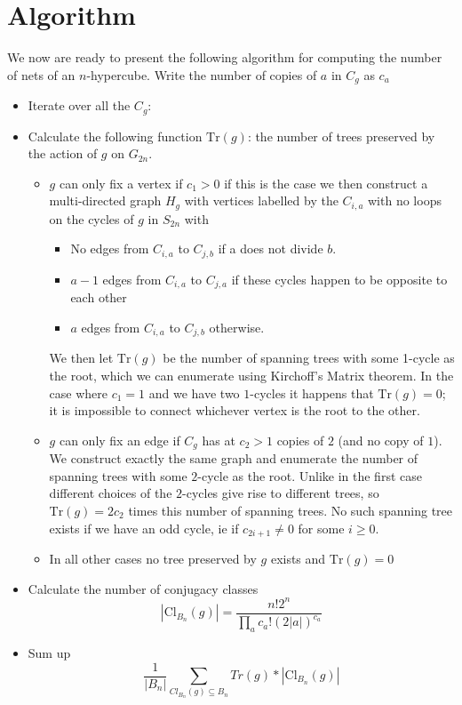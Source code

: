 \documentclass[10pt]{article}
\newcommand{\Tr}{\text{Tr}}
\newcommand{\Cl}{\text{Cl}}
\begin{document}
\section{Algorithm}
 We now are ready to present the following algorithm for computing the number of nets of an $n$-hypercube.
 Write the number of copies of $a$ in $C_g$ as $c_a$
\begin{itemize}
\item Iterate over all the $C_g$:
\item Calculate the following function $\Tr(g)$: the number of trees preserved by the action of $g$ on $G_{2n}$.
  \begin{itemize}
  \item $g$ can only fix a vertex if $c_1>0$ if this is the case we then construct a multi-directed graph $H_g$ with vertices labelled by the $C_{i,a}$ with no loops on the cycles of $g$ in $S_{2n}$ with
    \begin{itemize}
    \item No edges from $C_{i,a}$ to $C_{j,b}$ if a does not divide $b$.
    \item $a-1$ edges from $C_{i,a}$ to $C_{j,a}$ if these cycles happen to be opposite to each other
    \item $a$ edges from $C_{i,a}$ to $C_{j,b}$ otherwise.
    \end{itemize}
    We then let $\Tr(g)$ be the number of spanning trees with some 1-cycle as the root, which we can enumerate using Kirchoff's Matrix theorem. In the case where $c_1=1$ and we have two $1$-cycles it happens that $\Tr(g)=0$; it is impossible to connect whichever vertex is the root to the other.
  \item $g$ can only fix an edge if $C_g$ has at $c_2>1$ copies of $2$ (and no copy of $1$). We construct exactly the same graph and enumerate the number of spanning trees with some $2$-cycle as the root. Unlike in the first case different choices of the $2$-cycles give rise to different trees, so $\Tr(g) = 2c_2$ times this number of spanning trees. No such spanning tree exists if we have an odd cycle, ie if $c_{2i+1} \ne 0$ for some $i \ge 0$.
  \item In all other cases no tree preserved by $g$ exists and $\Tr(g)=0$
  \end{itemize}
\item Calculate the number of conjugacy classes
  \[|\Cl_{B_n}(g)|=\frac{n!2^n}{\prod_a c_a!(2|a|)^{c_a}}\]
\item Sum up
  \[\frac{1}{|B_n|}\sum_{Cl_{B_n}(g) \subseteq B_n}Tr(g)*|\Cl_{B_n}(g)|\]
\end{itemize}
\end{document}
